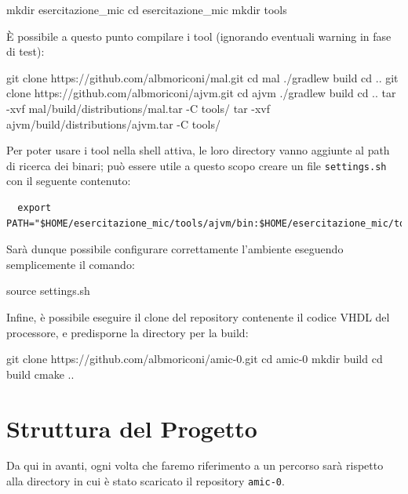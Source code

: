 \documentclass[a4paper,12pt]{scrreprt}
\begin{document}
\begin{commandshell}
  mkdir esercitazione_mic
  cd esercitazione_mic
  mkdir tools
\end{commandshell}

È possibile a questo punto compilare i tool (ignorando eventuali warning in fase
di test):

\begin{commandshell}
  git clone https://github.com/albmoriconi/mal.git
  cd mal
  ./gradlew build
  cd ..
  git clone https://github.com/albmoriconi/ajvm.git
  cd ajvm
  ./gradlew build
  cd ..
  tar -xvf mal/build/distributions/mal.tar -C tools/
  tar -xvf ajvm/build/distributions/ajvm.tar -C tools/
\end{commandshell}

Per poter usare i tool nella shell attiva, le loro directory vanno aggiunte al
path di ricerca dei binari; può essere utile a questo scopo creare un file
\lstinline{settings.sh} con il seguente contenuto:

\begin{lstlisting}
  export PATH="$HOME/esercitazione_mic/tools/ajvm/bin:$HOME/esercitazione_mic/tools/mal/bin:$PATH"
\end{lstlisting}

Sarà dunque possibile configurare correttamente l'ambiente eseguendo
semplicemente il comando:

\begin{commandshell}
  source settings.sh
\end{commandshell}

Infine, è possibile eseguire il clone del repository contenente il codice VHDL
del processore, e predisporne la directory per la build:

\begin{commandshell}
  git clone https://github.com/albmoriconi/amic-0.git
  cd amic-0
  mkdir build
  cd build
  cmake ..
\end{commandshell}

\section{Struttura del Progetto}

Da qui in avanti, ogni volta che faremo riferimento a un percorso sarà rispetto
alla directory in cui è stato scaricato il repository \lstinline{amic-0}.
\end{document}
